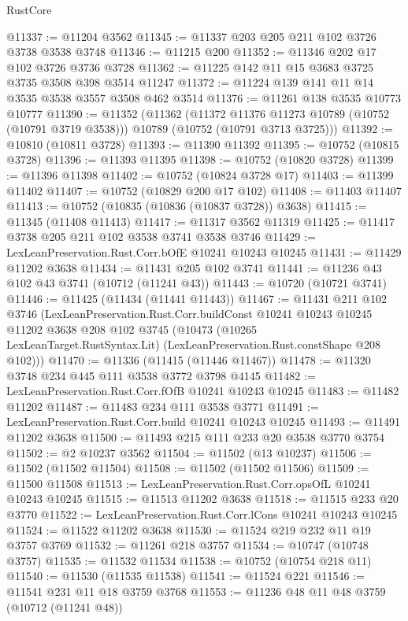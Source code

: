 \begin{lexlean}{RustCore}
\begin{coremodule}
@11337 := @11204 @3562
@11345 := @11337 @203 @205 @211 @102 @3726 @3738 @3538 @3748
@11346 := @11215 @200
@11352 := @11346 @202 @17 @102 @3726 @3736 @3728
@11362 := @11225 @142 @11 @15 @3683 @3725 @3735 @3508 @398 @3514 @11247
@11372 := @11224 @139 @141 @11 @14 @3535 @3538 @3557 @3508 @462 @3514
@11376 := @11261 @138 @3535 @10773 @10777
@11390 := @11352
    (@11362
      (@11372 @11376 @11273 @10789 (@10752 (@10791 @3719 @3538)))
      @10789
      (@10752 (@10791 @3713 @3725)))
@11392 := @10810 (@10811 @3728)
@11393 := @11390 @11392
@11395 := @10752 (@10815 @3728)
@11396 := @11393 @11395
@11398 := @10752 (@10820 @3728)
@11399 := @11396 @11398
@11402 := @10752 (@10824 @3728 @17)
@11403 := @11399 @11402
@11407 := @10752 (@10829 @200 @17 @102)
@11408 := @11403 @11407
@11413 := @10752 (@10835 (@10836 (@10837 @3728)) @3638)
@11415 := @11345 (@11408 @11413)
@11417 := @11317 @3562 @11319
@11425 := @11417 @3738 @205 @211 @102 @3538 @3741 @3538 @3746
@11429 := LexLeanPreservation.Rust.Corr.bOfE @10241 @10243 @10245
@11431 := @11429 @11202 @3638
@11434 := @11431 @205 @102 @3741
@11441 := @11236 @43 @102 @43 @3741 (@10712 (@11241 @43))
@11443 := @10720 (@10721 @3741)
@11446 := @11425 (@11434 (@11441 @11443))
@11467 := @11431
    @211
    @102
    @3746
    (LexLeanPreservation.Rust.Corr.buildConst
      @10241
      @10243
      @10245
      @11202
      @3638
      @208
      @102
      @3745
      (@10473
        (@10265 LexLeanTarget.RustSyntax.Lit)
        (LexLeanPreservation.Rust.constShape @208 @102)))
@11470 := @11336 (@11415 (@11446 @11467))
@11478 := @11320 @3748 @234 @445 @111 @3538 @3772 @3798 @4145
@11482 := LexLeanPreservation.Rust.Corr.fOfB @10241 @10243 @10245
@11483 := @11482 @11202
@11487 := @11483 @234 @111 @3538 @3771
@11491 := LexLeanPreservation.Rust.Corr.build @10241 @10243 @10245
@11493 := @11491 @11202 @3638
@11500 := @11493 @215 @111 @233 @20 @3538 @3770 @3754
@11502 := @2 @10237 @3562
@11504 := @11502 (@13 @10237)
@11506 := @11502 (@11502 @11504)
@11508 := @11502 (@11502 @11506)
@11509 := @11500 @11508
@11513 := LexLeanPreservation.Rust.Corr.opsOfL @10241 @10243 @10245
@11515 := @11513 @11202 @3638
@11518 := @11515 @233 @20 @3770
@11522 := LexLeanPreservation.Rust.Corr.lCons @10241 @10243 @10245
@11524 := @11522 @11202 @3638
@11530 := @11524 @219 @232 @11 @19 @3757 @3769
@11532 := @11261 @218 @3757
@11534 := @10747 (@10748 @3757)
@11535 := @11532 @11534
@11538 := @10752 (@10754 @218 @11)
@11540 := @11530 (@11535 @11538)
@11541 := @11524 @221
@11546 := @11541 @231 @11 @18 @3759 @3768
@11553 := @11236 @48 @11 @48 @3759 (@10712 (@11241 @48))

\end{coremodule}
\end{lexlean}
